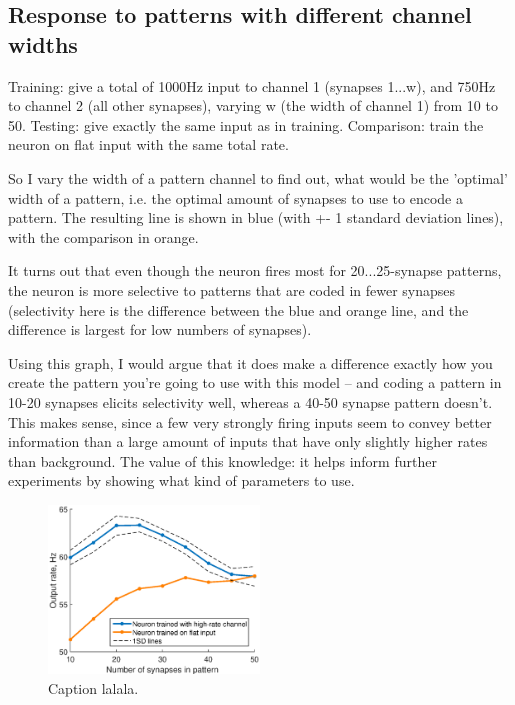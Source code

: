 \documentclass[a4paper,12pt]{report}
\theoremstyle{definition}
\begin{document}
\clearpage %
\subsection{Response to patterns with different channel widths}

Training: give a total of 1000Hz input to channel 1 (synapses 1...w), and 750Hz to channel 2 (all other synapses), varying w (the width of channel 1) from 10 to  50.
Testing: give exactly the same input as in training.
Comparison: train the neuron on flat input with the same total rate.

So I vary the width of a pattern channel to find out, what would be the 'optimal' width of a pattern, i.e. the optimal amount of synapses to use to encode a pattern. The resulting line is shown in blue (with +- 1 standard deviation lines), with the comparison in orange.

It turns out that even though the neuron fires most for 20...25-synapse patterns, the neuron is more selective to patterns that are coded in fewer synapses (selectivity here is the difference between the blue and orange line, and the difference is largest for low numbers of synapses).

Using this graph, I would argue that it does make a difference exactly how you create the pattern you're going to use with this model -- and coding a pattern in 10-20 synapses elicits selectivity well, whereas a 40-50 synapse pattern doesn't. This makes sense, since a few very strongly firing inputs seem to convey better information than a large amount of inputs that have only slightly higher rates than background.
The value of this knowledge: it helps inform further experiments by showing what kind of parameters to use.

\begin{figure}[h]
    \centering
    \includegraphics[width=0.5\textwidth]{figures/exp4_synapsecount.eps}
    \caption{Caption lalala.}
    \label{fig:exp4synapsecount}
\end{figure}
\end{document}
